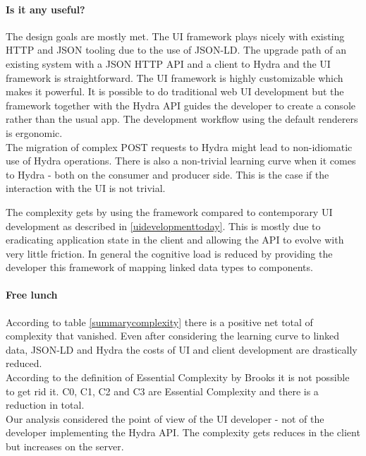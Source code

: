 \paragraph{Is it any useful?}
The design goals are mostly met. The UI framework plays nicely with existing HTTP and JSON tooling due to the use of JSON-LD. The upgrade path of an existing system with a JSON HTTP API and a client to Hydra and the UI framework is straightforward. The UI framework is highly customizable which makes it powerful. It is possible to do traditional web UI development but the framework together with the Hydra API guides the developer to create a console rather than the usual app. The development workflow using the default renderers is ergonomic. \\
The migration of complex POST requests to Hydra might lead to non-idiomatic use of Hydra operations. There is also a non-trivial learning curve when it comes to Hydra - both on the consumer and producer side. This is the case if the interaction with the UI is not trivial.

The complexity gets by using the framework compared to contemporary UI development as described in \ref{uidevelopmenttoday}. This is mostly due to eradicating application state in the client and allowing the API to evolve with very little friction. In general the cognitive load is reduced by providing the developer this framework of mapping linked data types to components.

\paragraph{Free lunch}
According to table \ref{summarycomplexity} there is a positive net total of complexity that vanished. Even after considering the learning curve to linked data, JSON-LD and Hydra the costs of UI and client development are drastically reduced. \\
According to the definition of Essential Complexity by Brooks it is not possible to get rid it. C0, C1, C2 and C3 are Essential Complexity and there is a reduction in total. \\
Our analysis considered the point of view of the UI developer - not of the developer implementing the Hydra API. The complexity gets reduces in the client but increases on the server.

